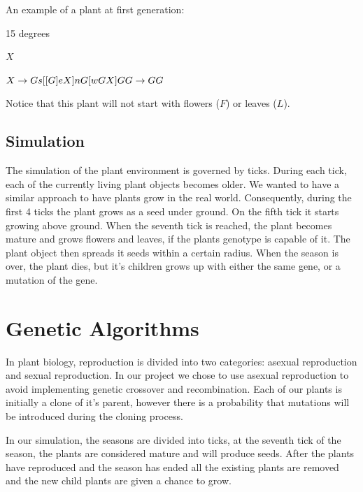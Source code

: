 \documentclass[conference]{acmsiggraph}
\begin{document}
An example of a plant at first generation:

\begin{description}[leftmargin=!,labelindent=0.2in,labelwidth=0.4in]
  \item[Angle] 15 degrees
  \item[Axiom] $ X $
  \item[Rules] $ X \rightarrow Gs[[G]eX]nG[wGX]G \\
                 G \rightarrow GG $
\end{description}

Notice that this plant will not start with flowers ($F$) or leaves ($L$).

\subsection{Simulation}

The simulation of the plant environment is governed by ticks. During each tick,
each of the currently living plant objects becomes older. We wanted to have a
similar approach to have plants grow in the real world. Consequently, during the
first 4 ticks the plant grows as a seed under ground. On the fifth tick it
starts growing above ground. When the seventh tick is reached, the plant becomes
mature and grows flowers and leaves, if the plants genotype is capable of it.
The plant object then spreads it seeds within a certain radius. When the season
is over, the plant dies, but it's children grows up with either the same gene,
or a mutation of the gene.

\section{Genetic Algorithms}

In plant biology, reproduction is divided into two categories: asexual
reproduction and sexual reproduction. In our project we chose to use asexual
reproduction to avoid implementing genetic crossover and recombination. Each of
our plants is initially a clone of it's parent, however there is a probability
that mutations will be introduced during the cloning process.\cite{plantrepo}

In our simulation, the seasons are divided into ticks, at the seventh tick of
the season, the plants are considered mature and will produce seeds. After the
plants have reproduced and the season has ended all the existing plants are
removed and the new child plants are given a chance to grow.
\end{document}
